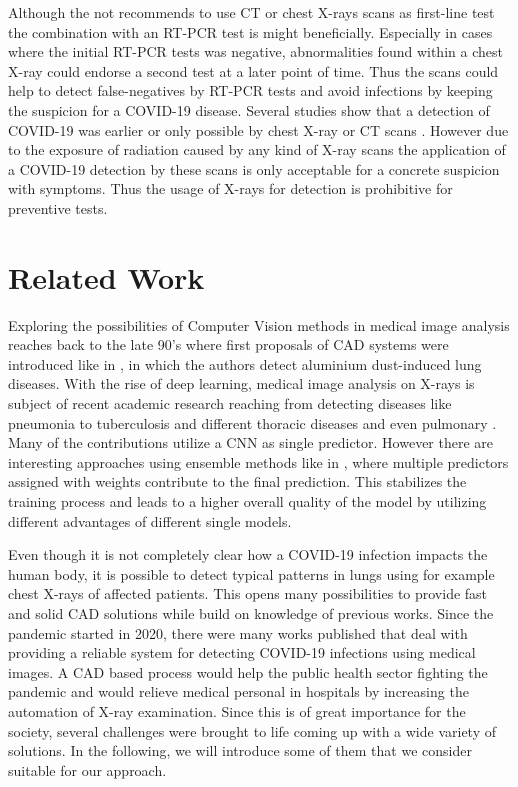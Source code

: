 Although the \citeauthor{acr2020recommendation} not recommends to use \ac{CT} or chest X-rays scans as first-line test \autocite{acr2020recommendation} the combination with an \ac{RT-PCR} test is might beneficially. Especially in cases where the initial \ac{RT-PCR} tests was negative, abnormalities found within a chest X-ray could endorse a second test at a later point of time. Thus the scans could help to detect false-negatives by \ac{RT-PCR} tests and avoid infections by keeping the suspicion for a COVID-19 disease. Several studies show that a detection of COVID-19 was earlier or only possible by chest X-ray or \ac{CT} scans \autocite{wang2020combination, tahamtan2020real}. However due to the exposure of radiation caused by any kind of X-ray scans the application of a COVID-19 detection by these scans is only acceptable for a concrete suspicion with symptoms. Thus the usage of X-rays for detection is prohibitive for preventive tests. 


\section{Related Work}
Exploring the possibilities of Computer Vision methods in medical image analysis reaches back to the late 90's where first proposals of \ac{CAD} systems were  introduced like in \autocite{kraus2000aluminium}, in which the authors detect aluminium dust-induced lung diseases.
With the rise of deep learning, medical image analysis on X-rays is subject of recent academic research reaching from detecting diseases like pneumonia \autocite{pneumoniaDetection} \autocite{pneumoniaDetection2} \autocite{gupta2019evolutionary} to tuberculosis and different thoracic diseases \autocite{jangam2021deep} and even pulmonary \autocite{vieira2021detecting}. Many of the contributions utilize a \ac{CNN} as single predictor. However there are interesting approaches using ensemble methods like in \autocite{livieris2019weighted}, where multiple predictors assigned with weights contribute to the final prediction. This stabilizes the training process and leads to a higher overall quality of the model by utilizing different advantages of different single models.

Even though it is not completely clear how a COVID-19 infection impacts the human body, it is possible to detect typical patterns in lungs using for example chest X-rays of affected patients. This opens many possibilities to provide fast and solid \ac{CAD} solutions while build on knowledge of previous works.
Since the pandemic started in 2020, there were many works published that deal with providing a reliable system for detecting COVID-19 infections using medical images. A \ac{CAD} based process would help the public health sector fighting the pandemic and would relieve medical personal in hospitals by increasing the automation of X-ray examination. Since this is of great importance for the society, several challenges were brought to life coming up with a wide variety of solutions. In the following, we will introduce some of them that we consider suitable for our approach.


